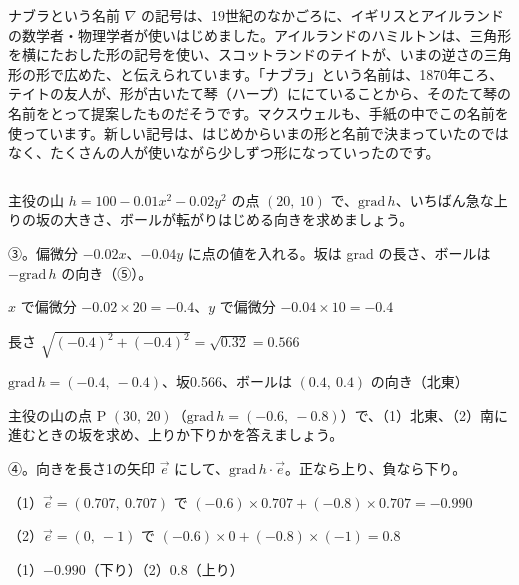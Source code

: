 {}

\begin{column}{ナブラという名前}
$\nabla$ の記号は、19世紀のなかごろに、イギリスとアイルランドの数学者・物理学者が使いはじめました。アイルランドのハミルトンは、三角形を横にたおした形の記号を使い、スコットランドのテイトが、いまの逆さの三角形の形で広めた、と伝えられています。「ナブラ」という名前は、1870年ころ、テイトの友人が、形が古いたて琴（ハープ）ににていることから、そのたて琴の名前をとって提案したものだそうです。マクスウェルも、手紙の中でこの名前を使っています。新しい記号は、はじめからいまの形と名前で決まっていたのではなく、たくさんの人が使いながら少しずつ形になっていったのです。
\end{column}


\begin{reidai}[主役の山の勾配]
主役の山 $h=100-0.01x^2-0.02y^2$ の点 $(20,\ 10)$ で、$\mathrm{grad}\,h$、いちばん急な上りの坂の大きさ、ボールが転がりはじめる向きを求めましょう。\par
\kangaekata ③。偏微分 $-0.02x$、$-0.04y$ に点の値を入れる。坂は grad の長さ、ボールは $-\mathrm{grad}\,h$ の向き（⑤）。\par
\shiki\kviiies{}\zw{} $x$ で偏微分 $-0.02\times20=-0.4$、$y$ で偏微分 $-0.04\times10=-0.4$\par
\kviiiea 長さ $\sqrt{(-0.4)^2+(-0.4)^2}=\sqrt{0.32}=0.566$\par
\kotae\kviiies{}\zw{} $\mathrm{grad}\,h=(-0.4,\ -0.4)$、坂0.566、ボールは $(0.4,\ 0.4)$ の向き（北東）
\end{reidai}



\begin{reidai}
主役の山の点 P $(30,\ 20)$（$\mathrm{grad}\,h=(-0.6,\ -0.8)$）で、（1）北東、（2）南に進むときの坂を求め、上りか下りかを答えましょう。\par
\kangaekata ④。向きを長さ1の矢印 $\vec e$ にして、$\mathrm{grad}\,h\cdot\vec e$。正なら上り、負なら下り。\par
\shiki\kviiies{}\zw{} （1）$\vec e=(0.707,\ 0.707)$ で $(-0.6)\times0.707+(-0.8)\times0.707=-0.990$\par
\kviiiea （2）$\vec e=(0,\ -1)$ で $(-0.6)\times0+(-0.8)\times(-1)=0.8$\par
\kotae\kviiies{}\zw{} （1）$-0.990$（下り）\quad （2）0.8（上り）
\end{reidai}

